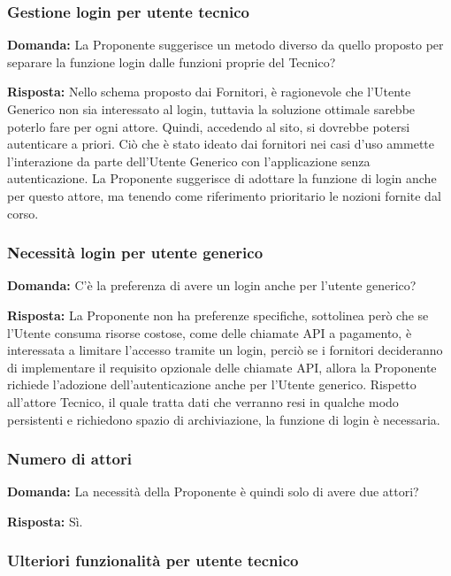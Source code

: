 \subsubsection{Gestione login per utente tecnico}

\textbf{Domanda:} La Proponente suggerisce un metodo diverso da quello proposto per separare la funzione login dalle funzioni proprie del Tecnico?

\textbf{Risposta:} Nello schema proposto dai Fornitori, è ragionevole che l'Utente Generico non sia interessato al login, tuttavia la soluzione ottimale sarebbe poterlo fare per ogni attore. Quindi, accedendo al sito, si dovrebbe potersi autenticare a priori.
Ciò che è stato ideato dai fornitori nei casi d’uso ammette l’interazione da parte dell’Utente Generico con l’applicazione senza autenticazione. La Proponente suggerisce di adottare la funzione di login anche per questo attore, ma tenendo come riferimento prioritario le nozioni fornite dal corso. 

\subsubsection{Necessità login per utente generico}

\textbf{Domanda:} C'è la preferenza di avere un login anche per l'utente generico?

\textbf{Risposta:} La Proponente non ha preferenze specifiche, sottolinea però che se l’Utente consuma risorse costose, come delle chiamate API a pagamento, è interessata a limitare l’accesso tramite un login, perciò se i fornitori decideranno di implementare il requisito opzionale delle chiamate API, allora la Proponente richiede l’adozione dell’autenticazione anche per l’Utente generico. Rispetto all’attore Tecnico, il quale tratta dati che verranno resi in qualche modo persistenti e richiedono spazio di archiviazione, la funzione di login è necessaria.

\subsubsection{Numero di attori}

\textbf{Domanda:} La necessità della Proponente è quindi solo di avere due attori?

\textbf{Risposta:} Sì.


\subsubsection{Ulteriori funzionalità per utente tecnico}

